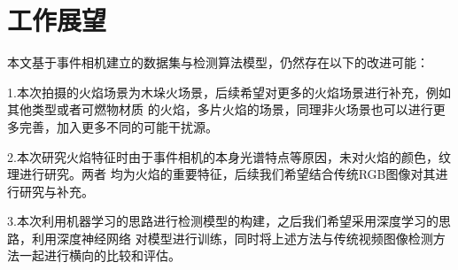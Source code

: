 \section{工作展望}
本文基于事件相机建立的数据集与检测算法模型，仍然存在以下的改进可能：

1.本次拍摄的火焰场景为木垛火场景，后续希望对更多的火焰场景进行补充，例如其他类型或者可燃物材质
的火焰，多片火焰的场景，同理非火场景也可以进行更多完善，加入更多不同的可能干扰源。

2.本次研究火焰特征时由于事件相机的本身光谱特点等原因，未对火焰的颜色，纹理进行研究。两者
均为火焰的重要特征，后续我们希望结合传统RGB图像对其进行研究与补充。

3.本次利用机器学习的思路进行检测模型的构建，之后我们希望采用深度学习的思路，利用深度神经网络
对模型进行训练，同时将上述方法与传统视频图像检测方法一起进行横向的比较和评估。